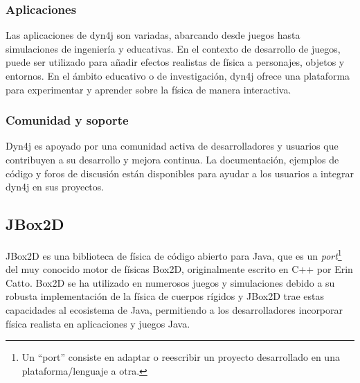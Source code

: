 \subsubsection{Aplicaciones}
Las aplicaciones de dyn4j son variadas, abarcando desde juegos hasta simulaciones de ingeniería y educativas. En el contexto de desarrollo de juegos, puede ser utilizado para añadir efectos realistas de física a personajes, objetos y entornos. En el ámbito educativo o de investigación, dyn4j ofrece una plataforma para experimentar y aprender sobre la física de manera interactiva.
\subsubsection{Comunidad y soporte}
Dyn4j es apoyado por una comunidad activa de desarrolladores y usuarios que contribuyen a su desarrollo y mejora continua. La documentación, ejemplos de código y foros de discusión están disponibles para ayudar a los usuarios a integrar dyn4j en sus proyectos.

\subsection{JBox2D}

JBox2D\cite{JBox2D} es una biblioteca de física de código abierto para Java, que es un \textit{port}\footnote{Un ``port'' consiste en adaptar o reescribir un proyecto desarrollado en una plataforma/lenguaje a otra.} del muy conocido motor de físicas Box2D, originalmente escrito en C++ por Erin Catto. Box2D se ha utilizado en numerosos juegos y simulaciones debido a su robusta implementación de la física de cuerpos rígidos y JBox2D trae estas capacidades al ecosistema de Java, permitiendo a los desarrolladores incorporar física realista en aplicaciones y juegos Java.

